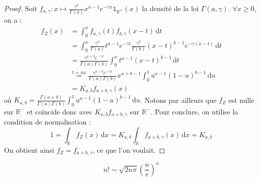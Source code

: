 	\begin{proof}
		Soit $f_{a,\gamma} : x \mapsto \frac{\gamma^a}{\Gamma(a)} x^{a-1} e^{-\gamma x} \mathbb{1}_{\mathbb{R}^+}(x)$ la densité de la loi $\Gamma(a, \gamma)$. $\forall x \geq 0$, on a :
		\begin{align*}
			f_Z(x) & = \int_0^x f_{a, \gamma}(t)f_{b, \gamma}(x-t) \, \mathrm{d}t \\
			& = \int_0^x \frac{\gamma^a}{\Gamma(a)} t^{a-1} e^{-\gamma t} \frac{\gamma^b}{\Gamma(b)} (x-t)^{b-1} e^{-\gamma (x-t)} \, \mathrm{d}t \\
			& = \frac{\gamma^{a+b} e^{-\gamma x}}{\Gamma(a) \Gamma(b)} \int_0^x t^{a-1} (x-t)^{b-1} \, \mathrm{d}t \\
			& \overset{t=ux}{=} \frac{\gamma^{a+b} e^{-\gamma x}}{\Gamma(a) \Gamma(b)} x^{a+b-1} \int_0^1 u^{a-1} (1-u)^{b-1} \, \mathrm{d}u \\
			& = K_{a,b} f_{a+b, \gamma}(x)
		\end{align*}
		où $K_{a,b} = \frac{\Gamma(a+b)}{\Gamma(a) \Gamma(b)} \int_0^1 u^{a-1} (1-u)^{b-1} \, \mathrm{d}u$. Notons par ailleurs que $f_Z$ est nulle sur $\mathbb{R}^-$ et coïncide donc avec $K_{a,b} f_{a+b, \gamma}$ sur $\mathbb{R}^-$.
		\newpar
		Pour conclure, on utilise la condition de normalisation :
		\[ 1 = \int_{\mathbb{R}} f_Z(x) \, \mathrm{d}x = K_{a,b} \int_{\mathbb{R}} f_{a+b, \gamma}(x) \, \mathrm{d}x = K_{a,b} \]
		On obtient ainsi $f_Z = f_{a+b, \gamma}$, ce que l'on voulait.
	\end{proof}


	\begin{theorem}
		\[ n! \sim \sqrt{2n\pi} \left(\frac{n}{e} \right)^n \]
	\end{theorem}

